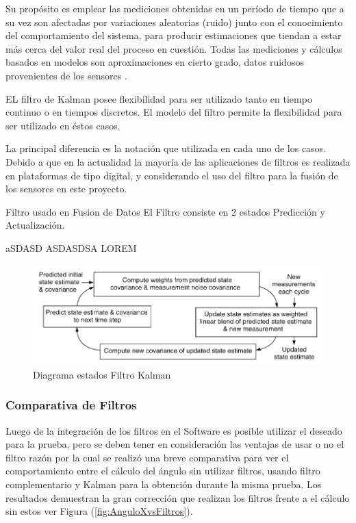 \documentclass[12pt,a4paper]{article}
\begin{document}
Su propósito es emplear las mediciones obtenidas en un período de tiempo que a su vez son afectadas por variaciones  aleatorias (ruido) junto con el conocimiento del comportamiento del sistema, para producir estimaciones que tiendan a estar más cerca del valor real del proceso en cuestión. Todas las mediciones y cálculos basados en modelos son aproximaciones en cierto grado, datos ruidosos provenientes de los sensores \cite[Capítulo 3, p.~45]{TesisUSM}. 

EL filtro de Kalman posee flexibilidad para ser utilizado tanto en tiempo continuo o en tiempos discretos. El modelo del filtro permite la flexibilidad para ser utilizado en éstos casos.

La principal diferencia es la notación que utilizada en cada uno de los casos.
Debido a que en la actualidad la mayoría de las aplicaciones de filtros es realizada en plataformas de tipo digital, y considerando el uso del filtro para la fusión de los sensores en este proyecto.

Filtro usado en Fusion de Datos \cite{mau_how_2005} 
El Filtro consiste en 2 estados Predicción y Actualización.

aSDASD
ASDASDSA LOREM

\begin{figure}[H]
	\centering
	\includegraphics[scale=0.5]{images/kalman-filter.png} 
	\caption{Diagrama estados Filtro Kalman}
	\label{fig:diagramakalman}
\end{figure}


\subsubsection{Comparativa de Filtros}
Luego de la integración de los filtros en el Software es posible utilizar el deseado para la prueba, pero se deben tener en consideración las ventajas de usar o no el filtro razón por la cual se realizó una breve comparativa para ver el comportamiento entre el cálculo del ángulo sin utilizar filtros, usando filtro complementario y Kalman para la obtención durante la misma prueba.
Los resultados demuestran la gran corrección que realizan los filtros frente a el cálculo sin estos ver Figura (\ref{fig:AnguloXvsFiltros}).
\end{document}
